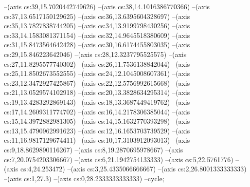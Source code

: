 --(axis cs:39,15.7020442749626)
--(axis cs:38,14.1016386770366)
--(axis cs:37,13.6517150129625)
--(axis cs:36,13.6395604328697)
--(axis cs:35,13.7827838744205)
--(axis cs:34,13.9199798430256)
--(axis cs:33,14.1583081371154)
--(axis cs:32,14.9645518380609)
--(axis cs:31,15.8473564642428)
--(axis cs:30,16.6174455803035)
--(axis cs:29,15.846223642046)
--(axis cs:28,12.3237795525575)
--(axis cs:27,11.8295577740302)
--(axis cs:26,11.7536138842044)
--(axis cs:25,11.8502673552555)
--(axis cs:24,12.1045008607361)
--(axis cs:23,12.3472927425867)
--(axis cs:22,12.5756992615668)
--(axis cs:21,13.0529574102918)
--(axis cs:20,13.3828634295314)
--(axis cs:19,13.4283292869143)
--(axis cs:18,13.3687449419762)
--(axis cs:17,14.2609311774702)
--(axis cs:16,14.2178306385044)
--(axis cs:15,14.3972882981305)
--(axis cs:14,15.1632770393298)
--(axis cs:13,15.4790962991623)
--(axis cs:12,16.1653703739529)
--(axis cs:11,16.9817129674411)
--(axis cs:10,17.3103912093013)
--(axis cs:9,18.8629890116267)
--(axis cs:8,19.2870695978667)
--(axis cs:7,20.0754203306667)
--(axis cs:6,21.1942754133333)
--(axis cs:5,22.5761776)
--(axis cs:4,24.253472)
--(axis cs:3,25.4335066666667)
--(axis cs:2,26.8001333333333)
--(axis cs:1,27.3)
--(axis cs:0,28.2333333333333)
--cycle;


